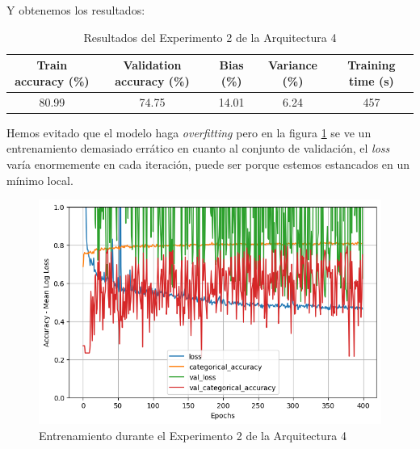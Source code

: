 \documentclass{article}
\begin{document}
			Y obtenemos los resultados:
			\begin{table}[!h]
				\begin{center}
					\begin{tabular}{| c | c | c | c | c |}
						\textbf{Train accuracy (\%)} & \textbf{Validation accuracy (\%)} & \textbf{Bias (\%)} & \textbf{Variance (\%)} & \textbf{Training time (s)} \\ \hline
						80.99 & 74.75 & 14.01 & 6.24 & 457 \\ \hline
					\end{tabular}
					\caption{Resultados del Experimento 2 de la Arquitectura 4}
					\label{tab:res-d-a4-e2}
				\end{center}
			\end{table}
			
			Hemos evitado que el modelo haga \textit{overfitting} pero en la figura \ref{d-tr-a4-e2} se ve un entrenamiento demasiado err\'atico en cuanto al conjunto de validaci\'on, el \textit{loss} var\'ia enormemente en cada iteraci\'on, puede ser porque estemos estancados en un m\'inimo local.
			\begin{figure}[!h]
				\begin{center}
					\includegraphics[scale=0.5]{d-tr-a4-e2.png}		
					\caption{Entrenamiento durante el Experimento 2 de la Arquitectura 4}	
					\label{d-tr-a4-e2}
				\end{center}
			\end{figure}
			
\end{document}
